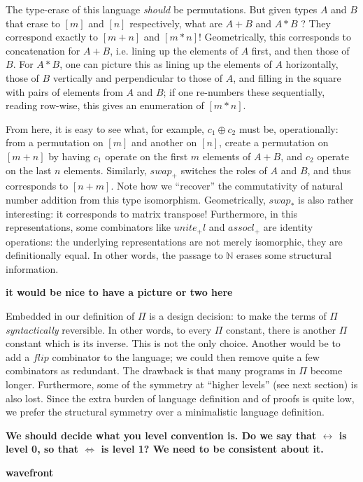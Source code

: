 \documentclass{article}
\newcommand{\identlp}{\mathit{unite}_+\mathit{l}}
\newcommand{\swapp}{\mathit{swap}_+}
\newcommand{\assoclp}{\mathit{assocl}_+}
\newcommand{\swapt}{\mathit{swap}_*}
\newcommand{\iso}{\leftrightarrow}
\newcommand{\jc}[1]{\fbox{Jacques says:} \textbf{#1}}
\newcommand{\fin}[1]{\ensuremath{\left[#1\right]}}
\newcommand{\Nat}{\ensuremath{\mathbb{N}}}
\begin{document}
The type-erase of this language \emph{should} be permutations. But
given types $A$ and $B$ that erase to $\fin{m}$ and $\fin{n}$ respectively,
what are $A + B$ and $A * B$ ?  They correspond exactly to
$\fin{m+n}$ and $\fin{m*n}$!  Geometrically, this corresponds to
concatenation for $A + B$, i.e. lining up the elements of $A$ first,
and then those of $B$. For $A * B$, one can picture this as
lining up the elements of $A$ horizontally, those of $B$ vertically
and perpendicular to those of $A$, and filling in the square with
pairs of elements from $A$ and $B$; if one re-numbers these sequentially,
reading row-wise, this gives an enumeration of $\fin{m*n}$.

From here, it is easy to see what, for example, $c_1 \oplus c_2$ must be,
operationally: from a permutation on $\fin{m}$ and another on $\fin{n}$,
create a permutation on $\fin{m+n}$ by having $c_1$ operate on the first
$m$ elements of $A+B$, and $c_2$ operate on the last $n$ elements. 
Similarly, $\swapp$ switches the roles of $A$ and $B$, and thus corresponds
to $\fin{n+m}$. Note how we ``recover'' the commutativity of 
natural number addition from this type isomorphism. Geometrically, $\swapt$
is also rather interesting: it corresponds to matrix transpose!
Furthermore, in this representations, some combinators like
$\identlp$ and $\assoclp$ are identity operations: the underlying representations
are not merely isomorphic, they are definitionally equal.
In other words, the passage to $\Nat$ erases some structural information.

\jc{it would be nice to have a picture or two here}

Embedded in our definition of $\Pi$ is a design decision: to make the
terms of $\Pi$ \emph{syntactically} reversible. In other words, to
every $\Pi$ constant, there is another $\Pi$ constant which is its
inverse. This is not the only choice.  Another would be to add a
$\mathit{flip}$ combinator to the language; we could then remove
quite a few combinators as redundant. The drawback is that many
programs in $\Pi$ become longer. Furthermore, some of the symmetry
at ``higher levels'' (see next section) is also lost. Since the
extra burden of language definition and of proofs is quite low, we
prefer the structural symmetry over a minimalistic language definition.

\jc{We should decide what you level convention is. Do we say
that $\iso$ is level 0, so that $\Leftrightarrow$ is level 1?
We need to be consistent about it.}

\jc{wavefront}
\end{document}
